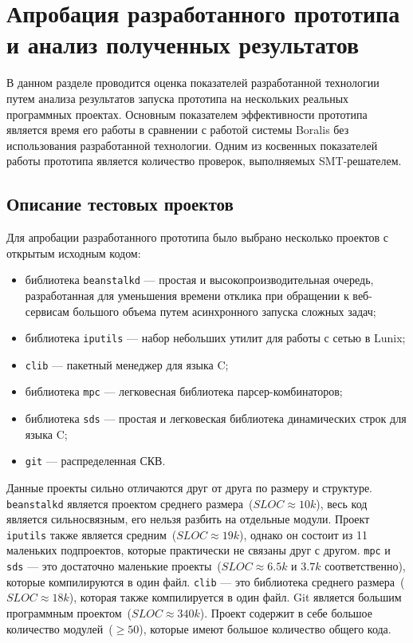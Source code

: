 \chapter{Апробация разработанного прототипа и анализ полученных результатов}
\label{chapter:testing}
В данном разделе проводится оценка показателей разработанной технологии путем 
анализа результатов запуска прототипа на несколь­ких реальных программных 
проектах. Основным показателем эффективности прототипа является время его работы
в сравнении с работой системы Boralis без использования разработанной технологии.
Одним из косвенных показателей работы прототипа является количество проверок,
выполняемых SMT-решателем.

\section{Описание тестовых проектов}
Для апробации разработанного прототипа было выбрано несколько проектов с открытым
исходным кодом:
\begin{itemize}
\item библиотека \texttt{beanstalkd} --- простая и высокопроизводительная 
оче­редь, разработанная для уменьшения времени отклика при об­ращении к веб-
сервисам большого объема путем асинхронного запуска сложных задач;
\item библиотека \texttt{iputils} --- набор небольших утилит для работы с
се­тью в Lunix;
\item \texttt{clib} --- пакетный менеджер для языка C;
\item библиотека \texttt{mpc} --- легковесная библиотека парсер-комбинаторов;
\item библиотека \texttt{sds} --- простая и легковеская библиотека динамических
строк для языка C;
\item \texttt{git} — распределенная СКВ.
\end{itemize}

Данные проекты сильно отличаются друг от друга по размеру и структуре. 
\texttt{beanstalkd} является проектом среднего размера~($SLOC \approx 10k$), 
весь код является сильносвязным, его нельзя разбить на отдельные модули. Проект 
\texttt{iputils} также явля­ется средним~($SLOC \approx 19k$), однако он состоит 
из 11 маленьких подпроектов, которые практически не связаны друг с другом. 
\texttt{mpc} и \texttt{sds} --- это достаточно маленькие проекты~($SLOC \approx 
6.5k$ и $3.7k$ соответственно), которые компилируются в один файл. \texttt{clib} 
--- это библиотека среднего размера~($SLOC \approx 18k$), которая также 
компилируется в один файл. Git является большим программным проектом~($SLOC 
\approx 340k$). Проект содержит в себе большое количество модулей~($\ge 50$), которые имеют большое количество общего кода.

